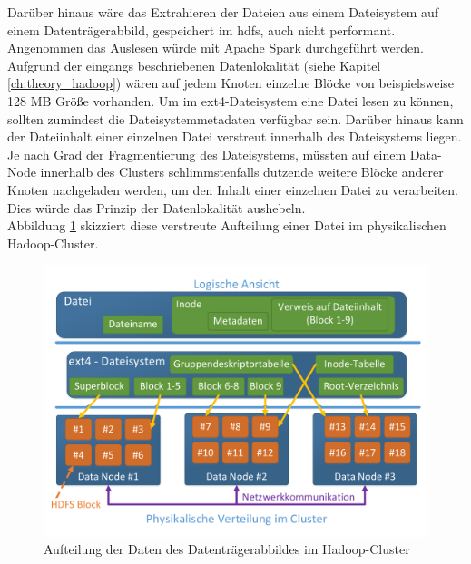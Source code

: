 \noindent
Darüber hinaus wäre das Extrahieren der Dateien aus einem Dateisystem auf einem Datenträgerabbild, gespeichert im \gls{hdfs}, auch nicht performant. Angenommen das Auslesen würde mit Apache Spark durchgeführt werden. Aufgrund der eingangs beschriebenen Datenlokalität (siehe Kapitel \ref{ch:theory_hadoop}) wären auf jedem Knoten einzelne Blöcke von beispielsweise 128 MB Größe vorhanden. Um im ext4-Dateisystem eine Datei lesen zu können, sollten zumindest die Dateisystemmetadaten verfügbar sein. Darüber hinaus kann der Dateiinhalt einer einzelnen Datei verstreut innerhalb des Dateisystems liegen. Je nach Grad der Fragmentierung des Dateisystems, müssten auf einem Data-Node innerhalb des Clusters schlimmstenfalls dutzende weitere Blöcke anderer Knoten nachgeladen werden, um den Inhalt einer einzelnen Datei zu verarbeiten. Dies würde das Prinzip der Datenlokalität aushebeln.\\
Abbildung \ref{fig:ext4_to_hdfs} skizziert diese verstreute Aufteilung einer Datei im physikalischen Hadoop-Cluster.\\ 
\begin{figure}[ht]
  \centering
  \includegraphics[width=\textwidth]{./resource/ext4_to_hdfs.pdf}
  \caption{Aufteilung der Daten des Datenträgerabbildes im Hadoop-Cluster}
  \label{fig:ext4_to_hdfs}
\end{figure}

